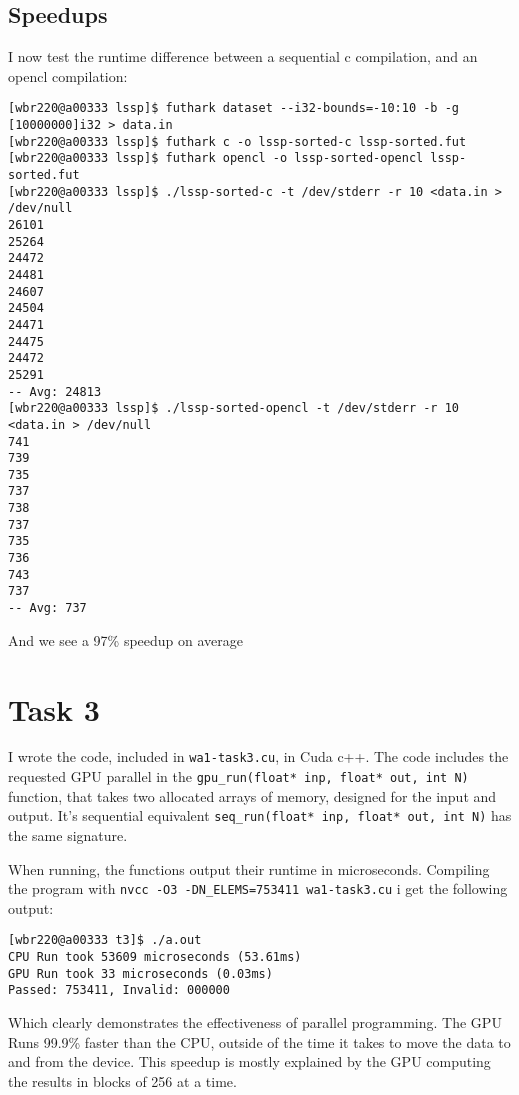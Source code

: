 \documentclass[11pt]{article}
\begin{document}
\subsection{Speedups}
\label{sec:org36c3c6f}
I now test the runtime difference between a sequential c compilation, and an opencl compilation:
\begin{verbatim}
[wbr220@a00333 lssp]$ futhark dataset --i32-bounds=-10:10 -b -g [10000000]i32 > data.in
[wbr220@a00333 lssp]$ futhark c -o lssp-sorted-c lssp-sorted.fut
[wbr220@a00333 lssp]$ futhark opencl -o lssp-sorted-opencl lssp-sorted.fut
[wbr220@a00333 lssp]$ ./lssp-sorted-c -t /dev/stderr -r 10 <data.in > /dev/null
26101
25264
24472
24481
24607
24504
24471
24475
24472
25291
-- Avg: 24813
[wbr220@a00333 lssp]$ ./lssp-sorted-opencl -t /dev/stderr -r 10 <data.in > /dev/null
741
739
735
737
738
737
735
736
743
737
-- Avg: 737
\end{verbatim}
And we see a 97\% speedup on average

\section{Task 3}
\label{sec:org8862fb8}
I wrote the code, included in \texttt{wa1-task3.cu}, in Cuda c++. The code includes the requested
GPU parallel in the \texttt{gpu\_run(float* inp, float* out, int N)} function, that takes two
allocated arrays of memory, designed for the input and output. It's sequential equivalent
\texttt{seq\_run(float* inp, float* out, int N)} has the same signature.  

When running, the functions output their runtime in microseconds. Compiling the program
with \texttt{nvcc -O3 -DN\_ELEMS=753411 wa1-task3.cu} i get the following output:
\begin{verbatim}
[wbr220@a00333 t3]$ ./a.out
CPU Run took 53609 microseconds (53.61ms)
GPU Run took 33 microseconds (0.03ms)
Passed: 753411, Invalid: 000000
\end{verbatim}
Which clearly demonstrates the effectiveness of parallel programming. The GPU Runs 99.9\%
faster than the CPU, outside of the time it takes to move the data to and from the device.
This speedup is mostly explained by the GPU computing the results in blocks of 256 at a
time.
\end{document}
